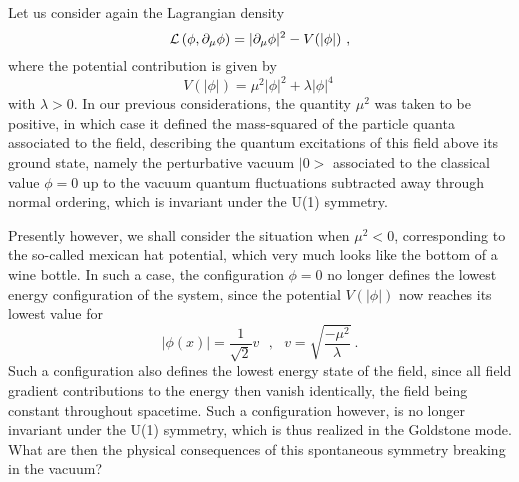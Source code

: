 \documentclass[a4paper,11pt]{article}
\begin{document}
Let us consider again the Lagrangian density
\begin{equation}
{\cal L}\left(\phi,\partial_\mu\phi\right)=
|\partial_\mu\phi|^2-V(|\phi|)\ ,
\end{equation}
where the potential contribution is given by
\begin{equation}
V(|\phi|)=\mu^2|\phi|^2+\lambda|\phi|^4\ 
\end{equation}
with $\lambda>0$. In our previous considerations, the quantity $\mu^2$
was taken to be positive, in which case it defined the mass-squared of the
particle quanta associated to the field, describing the quantum
excitations of this field above its ground state, namely the perturbative
vacuum $|0>$ associated to the classical value $\phi=0$ up to the vacuum
quantum fluctuations subtracted away through normal ordering, which is
invariant under the U(1) symmetry. 

Presently however, we shall consider the situation when $\mu^2<0$,
cor\-res\-pon\-ding to the so-called mexican hat potential, which very much 
looks like the bottom of a wine bottle. In such a case, the configuration 
$\phi=0$ no longer defines the lowest energy configuration of the system, 
since the potential $V(|\phi|)$ now reaches its lowest value for
\begin{equation}
|\phi(x)|=\frac{1}{\sqrt{2}}v\ \ \ ,\ \ \ 
v=\sqrt{\frac{-\mu^2}{\lambda}}\ .
\end{equation}
Such a configuration also defines the lowest energy state of the field,
since all field gradient contributions to the energy then vanish
identically, the field being constant throughout spacetime. Such a 
configuration however, is no longer invariant under the U(1) symmetry,
which is thus realized in the Goldstone mode. What are then the physical
consequences of this spontaneous symmetry breaking in the vacuum?
\end{document}
